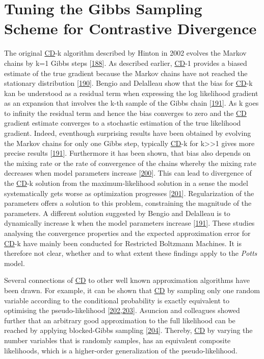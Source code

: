 \documentclass[11pt,a4paper,twoside]{book}
\theoremstyle{definition}
\theoremstyle{definition}
\theoremstyle{remark}
\begin{document}
\section{Tuning the Gibbs Sampling Scheme for Contrastive
Divergence}\label{cd-sampling-optimization}

The original \protect\hyperlink{abbrev}{CD}-k algorithm described by
Hinton in 2002 evolves the Markov chains by k=1 Gibbs steps
{[}\protect\hyperlink{ref-Hinton2002}{188}{]}. As described earlier,
\protect\hyperlink{abbrev}{CD}-1 provides a biased estimate of the true
gradient because the Markov chains have not reached the stationary
distribution {[}\protect\hyperlink{ref-Fischer2012}{190}{]}. Bengio and
Delalleau show that the bias for \protect\hyperlink{abbrev}{CD}-k kan be
understood as a residual term when expressing the log likelihood
gradient as an expansion that involves the k-th sample of the Gibbs
chain {[}\protect\hyperlink{ref-Bengio2009}{191}{]}. As k goes to
infinity the residual term and hence the bias converges to zero and the
\protect\hyperlink{abbrev}{CD} gradient estimate converges to a
stochastic estimation of the true likelihood gradient. Indeed,
eventhough surprising results have been obtained by evolving the Markov
chains for only one Gibbs step, typically
\protect\hyperlink{abbrev}{CD}-k for k\textgreater{}\textgreater{}1
gives more precise results
{[}\protect\hyperlink{ref-Bengio2009}{191}{]}. Furthermore it has been
shown, that bias also depends on the mixing rate or the rate of
convergence of the chains whereby the mixing rate decreases when model
parameters increase {[}\protect\hyperlink{ref-Tieleman2008}{200}{]}.
This can lead to divergence of the \protect\hyperlink{abbrev}{CD}-k
solution from the maximum-likelihood solution in a sense the model
systematically gets worse as optimization progresses
{[}\protect\hyperlink{ref-Fischer2010}{201}{]}. Regularization of the
parameters offers a solution to this problem, constraining the magnitude
of the parameters. A different solution suggested by Bengio and
Delalleau is to dynamically increase k when the model parameters
increase {[}\protect\hyperlink{ref-Bengio2009}{191}{]}. These studies
analysing the convergence properties and the expected approximation
error for \protect\hyperlink{abbrev}{CD}-k have mainly been conducted
for Restricted Boltzmann Machines. It is therefore not clear, whether
and to what extent these findings apply to the \emph{Potts} model.

Several connections of \protect\hyperlink{abbrev}{CD} to other well
known approximation algorithms have been drawn. For example, it can be
shown that \protect\hyperlink{abbrev}{CD} by sampling only one random
variable according to the conditional probability is exactly equivalent
to optimising the pseudo-likelihood
{[}\protect\hyperlink{ref-Hyvarinen2006}{202},\protect\hyperlink{ref-Hyvarinen2007}{203}{]}.
Asuncion and colleagues showed further that an arbitrary good
approximation to the full likelihood can be reached by applying
blocked-Gibbs sampling {[}\protect\hyperlink{ref-Asuncion2010}{204}{]}.
Thereby, \protect\hyperlink{abbrev}{CD} by varying the number variables
that is randomly samples, has an equivalent composite likelihoods, which
is a higher-order generalization of the pseudo-likelihood.
\end{document}
